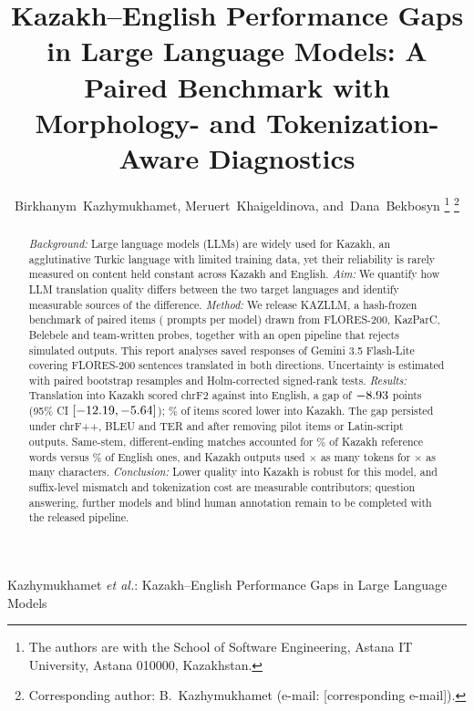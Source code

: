 \documentclass[journal]{IEEEtran}
\begin{document}
\title{Kazakh--English Performance Gaps in Large Language Models: A Paired Benchmark with Morphology- and Tokenization-Aware Diagnostics}

\author{Birkhanym~Kazhymukhamet,
        Meruert~Khaigeldinova,
        and~Dana~Bekbosyn%
\thanks{The authors are with the School of Software Engineering, Astana IT University, Astana 010000, Kazakhstan.}%
\thanks{Corresponding author: B.~Kazhymukhamet (e-mail: [corresponding e-mail]).}}

%
{Kazhymukhamet \MakeLowercase{\textit{et al.}}: Kazakh--English Performance Gaps in Large Language Models}

\maketitle

\begin{abstract}
\textit{Background:} Large language models (LLMs) are widely used for Kazakh, an agglutinative Turkic language with limited training data, yet their reliability is rarely measured on content held constant across Kazakh and English.
\textit{Aim:} We quantify how LLM translation quality differs between the two target languages and identify measurable sources of the difference.
\textit{Method:} We release KAZLLM, a hash-frozen benchmark of \NItems{} paired items (\NPromptsPerModel{} prompts per model) drawn from FLORES-200, KazParC, Belebele and team-written probes, together with an open pipeline that rejects simulated outputs. This report analyses \NResponses{} saved responses of Gemini 3.5 Flash-Lite covering \NPairs{} FLORES-200 sentences translated in both directions. Uncertainty is estimated with \NBoot{} paired bootstrap resamples and Holm-corrected signed-rank tests.
\textit{Results:} Translation into Kazakh scored \GemChrfKK{} chrF2 against \GemChrfEN{} into English, a gap of $-8.93$ points (95\% CI $[-12.19, -5.64]$); \ItemsBelowPct\% of items scored lower into Kazakh. The gap persisted under chrF++, BLEU and TER and after removing pilot items or Latin-script outputs. Same-stem, different-ending matches accounted for \NmKK\% of Kazakh reference words versus \NmEN\% of English ones, and Kazakh outputs used \TokRatio$\times$ as many tokens for \CharRatio$\times$ as many characters.
\textit{Conclusion:} Lower quality into Kazakh is robust for this model, and suffix-level mismatch and tokenization cost are measurable contributors; question answering, further models and blind human annotation remain to be completed with the released pipeline.
\end{abstract}
\end{document}

